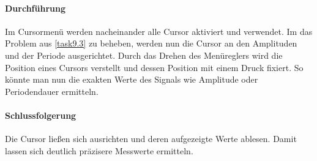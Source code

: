 \paragraph{Durchführung}
Im Cursormenü werden nacheinander alle Cursor aktiviert und verwendet. Im das Problem aus \ref{task9.3} zu beheben, werden nun die Cursor an den Amplituden und der Periode ausgerichtet. Durch das Drehen des Menüreglers wird die Position eines Cursors verstellt und dessen Position mit einem Druck fixiert. So könnte man nun die exakten Werte des Signals wie Amplitude oder Periodendauer ermitteln.

\paragraph{Schlussfolgerung}
Die Cursor ließen sich ausrichten und deren aufgezeigte Werte ablesen. Damit lassen sich deutlich präzisere Messwerte ermitteln.